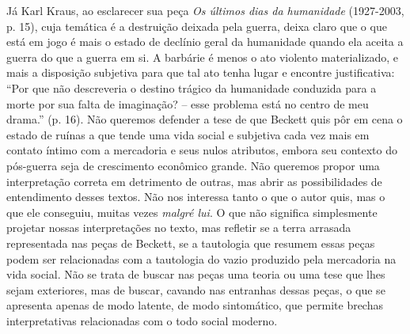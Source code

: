 Já Karl Kraus, ao esclarecer sua peça \emph{Os últimos dias da
humanidade} (1927-2003, p. 15), cuja temática é a destruição deixada
pela guerra, deixa claro que o que está em jogo é mais o estado de
declínio geral da humanidade quando ela aceita a guerra do que a guerra
em si. A barbárie é menos o ato violento materializado, e mais a
disposição subjetiva para que tal ato tenha lugar e encontre
justificativa: ``Por que não descreveria o destino trágico da humanidade
conduzida para a morte por sua falta de imaginação? -- esse problema
está no centro de meu drama.'' (p. 16). Não queremos defender a tese de
que Beckett quis pôr em cena o estado de ruínas a que tende uma vida
social e subjetiva cada vez mais em contato íntimo com a mercadoria e
seus nulos atributos, embora seu contexto do pós-guerra seja de
crescimento econômico grande. Não queremos propor uma interpretação
correta em detrimento de outras, mas abrir as possibilidades de
entendimento desses textos. Não nos interessa tanto o que o autor quis,
mas o que ele conseguiu, muitas vezes \emph{malgré lui}. O que não
significa simplesmente projetar nossas interpretações no texto, mas
refletir se a terra arrasada representada nas peças de Beckett, se a
tautologia que resumem essas peças podem ser relacionadas com a
tautologia do vazio produzido pela mercadoria na vida social. Não se
trata de buscar nas peças uma teoria ou uma tese que lhes sejam
exteriores, mas de buscar, cavando nas entranhas dessas peças, o que se
apresenta apenas de modo latente, de modo sintomático, que permite
brechas interpretativas relacionadas com o todo social moderno.

